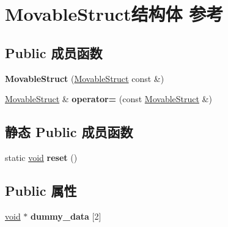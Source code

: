 \hypertarget{struct_movable_struct}{}\section{Movable\+Struct结构体 参考}
\label{struct_movable_struct}
\subsection*{Public 成员函数}
\begin{DoxyCompactItemize}
\item 
\mbox{\label{struct_movable_struct_a8b09d195f4569c3a6bc90b811d96fc30}} 
{\bfseries Movable\+Struct} (\hyperlink{struct_movable_struct}{Movable\+Struct} const \&)
\item 
\mbox{\label{struct_movable_struct_aa16ec8257398a8b85c5102a83825a0ae}} 
\hyperlink{struct_movable_struct}{Movable\+Struct} \& {\bfseries operator=} (const \hyperlink{struct_movable_struct}{Movable\+Struct} \&)
\end{DoxyCompactItemize}
\subsection*{静态 Public 成员函数}
\begin{DoxyCompactItemize}
\item 
\mbox{\label{struct_movable_struct_a32d3b08852ba0fb7b181742726d63ada}} 
static \hyperlink{interfacevoid}{void} {\bfseries reset} ()
\end{DoxyCompactItemize}
\subsection*{Public 属性}
\begin{DoxyCompactItemize}
\item 
\mbox{\label{struct_movable_struct_a63aec7d7885dbb1aa4b80f09edfb60fd}} 
\hyperlink{interfacevoid}{void} $\ast$ {\bfseries dummy\+\_\+data} \mbox{[}2\mbox{]}
\end{DoxyCompactItemize}
